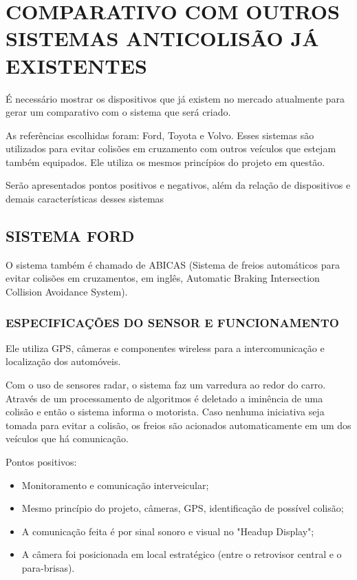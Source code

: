 \chapter[COMPARATIVO COM OUTROS SISTEMAS ANTICOLISÃO JÁ EXISTENTES]{COMPARATIVO COM OUTROS SISTEMAS ANTICOLISÃO JÁ EXISTENTES}

É necessário mostrar os dispositivos que já existem no mercado atualmente para
gerar um comparativo com o sistema que será criado.

As referências escolhidas foram:  Ford, Toyota e Volvo. Esses sistemas
são utilizados para evitar colisões em cruzamento com outros  veículos  que
estejam também equipados.  Ele  utiliza  os  mesmos  princípios  do projeto em questão.

Serão apresentados pontos positivos e negativos, além da relação de dispositivos
e demais características desses sistemas

\section{ SISTEMA FORD}
O sistema também é chamado de ABICAS (Sistema de freios automáticos para evitar
colisões  em  cruzamentos,  em  inglês,   Automatic  Braking  Intersection
 Collision  Avoidance  System).

\subsection{ESPECIFICAÇÕES DO SENSOR E FUNCIONAMENTO}

Ele  utiliza  GPS,  câmeras  e  componentes  wireless  para
a  intercomunicação e localização dos automóveis.

Com o uso de sensores radar, o sistema faz um varredura ao
 redor do carro. Através de um processamento de algoritmos é
 deletado a iminência de uma colisão e então o sistema informa
 o motorista. Caso nenhuma iniciativa seja tomada para evitar a
 colisão, os freios são acionados automaticamente em um dos veículos
 que há comunicação.


 Pontos positivos:

 \begin{itemize}
   \item Monitoramento e comunicação interveicular;
   \item Mesmo princípio do projeto, câmeras, GPS, identificação de possível colisão;
   \item A comunicação feita é por sinal sonoro e visual no "Headup Display";
   \item A  câmera  foi  posicionada  em  local  estratégico  (entre  o  retrovisor  central  e  o para-brisas).
 \end{itemize}

